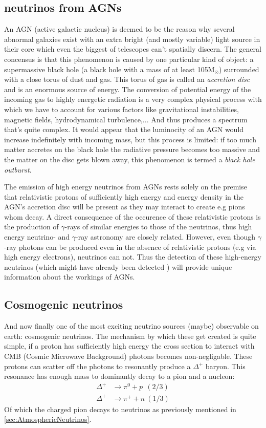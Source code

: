 \documentclass[11pt,a4paper,faculty=we,language=en,doctype=report]{cls/ugent-doc}
\begin{document}
\subsection{neutrinos from AGNs}
An AGN (active galactic nucleus) is deemed to be the reason why several abnormal galaxies exist with
an extra bright (and mostly variable) light source in their core which even the biggest of telescopes
can't spatially discern. The general concensus is that this phenomenon is caused by one particular
kind of object: a supermassive black hole (a black hole with a mass of at least 105M$_\odot$) surrounded with
a close torus of dust and gas.
This torus of gas is called an \textit{accretion disc} and is an enormous source of energy. The conversion
of potential energy of the incoming gas to highly energetic radiation is a very complex physical process
with which we have to account for various factors like gravitational instabilities, magnetic fields, hydrodynamical
turbulence,... And thus produces a spectrum that's quite complex.
It would appear that the luminocity of an AGN would increase indefinitely with incoming mass, but this process is 
limited: if too much matter accretes on the black hole the radiative pressure becomes too massive and the 
matter on the disc gets blown away, this phenomenon is termed a \textit{black hole outburst}.

The emission of high energy neutrinos from AGNs rests solely on the premise
that relativistic protons of sufficiently high energy and energy density in the
AGN's accretion disc will be present \cite{NASANeutrinos} as they may interact
to create e.g pions whom decay. A direct consequence of the occurence of these
relativistic protons is the production of $\gamma$-rays of similar energies to
those of the neutrinos, thus high energy neutrino- and $\gamma$-ray astronomy are
closely related.  However, even though $\gamma$-ray photons can be produced
even in the absence of relativistic protons (e.g via high energy electrons),
neutrinos can not.  Thus the detection of these high-energy neutrinos (which
might have already been detected \cite{AGNNeutrino}) will provide unique
information about the workings of AGNs.

\subsection{Cosmogenic neutrinos}
And now finally one of the most exciting neutrino sources (maybe) observable on
earth: cosmogenic neutrinos. The mechanism by which these get created is quite
simple, if a proton has sufficiently high energy the cross section to interact
with CMB (Cosmic Microwave Background) photons becomes non-negligable.  These
protons can scatter off the photons to resonantly produce a $\Delta^+$ baryon.
This resonance has enough mass to dominantly decay to a pion and a nucleon:
\begin{align}
	\Delta^+ &\rightarrow \pi^0 + p \ \ (2/3)\\
	\Delta^+ &\rightarrow \pi^+ + n \ (1/3)
\end{align}
Of which the charged pion decays to neutrinos as previously mentioned in 
\ref{sec:AtmosphericNeutrinos}.
\end{document}
